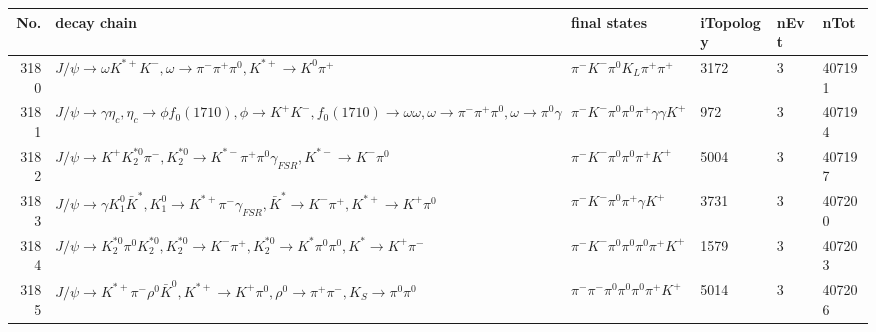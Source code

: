 \begin{table}[htbp] 
\begin{center}
\begin{small}
\begin{tabular}{rlllll}\hline\hline
 No. & decay chain & final states &  iTopology & nEvt & nTot \\\hline
3180&$J/\psi       \rightarrow \omega         K^{*+}         K^{-}          , \omega          \rightarrow \pi^{-}        \pi^{+}        \pi^{0}        , K^{*+}          \rightarrow K^{0}          \pi^{+}        $&$\pi^{-}        K^{-}          \pi^{0}        K_{L}          \pi^{+}        \pi^{+}        $& 3172&    3&407191\\
3181&$J/\psi       \rightarrow \gamma       \eta_{c}    , \eta_{c}     \rightarrow \phi           f_{0}(1710)    , \phi            \rightarrow K^{+}          K^{-}          , f_{0}(1710)     \rightarrow \omega         \omega         , \omega          \rightarrow \pi^{-}        \pi^{+}        \pi^{0}        , \omega          \rightarrow \pi^{0}        \gamma       $&$\pi^{-}        K^{-}          \pi^{0}        \pi^{0}        \pi^{+}        \gamma       \gamma       K^{+}          $&  972&    3&407194\\
3182&$J/\psi       \rightarrow K^{+}          K_2^{*0}       \pi^{-}        , K_2^{*0}        \rightarrow K^{*-}         \pi^{+}        \pi^{0}        \gamma_{FSR} , K^{*-}          \rightarrow K^{-}          \pi^{0}        $&$\pi^{-}        K^{-}          \pi^{0}        \pi^{0}        \pi^{+}        K^{+}          $& 5004&    3&407197\\
3183&$J/\psi       \rightarrow \gamma       K_1^{0}        \bar{K}^{*}   , K_1^{0}         \rightarrow K^{*+}         \pi^{-}        \gamma_{FSR} , \bar{K}^{*}    \rightarrow K^{-}          \pi^{+}        , K^{*+}          \rightarrow K^{+}          \pi^{0}        $&$\pi^{-}        K^{-}          \pi^{0}        \pi^{+}        \gamma       K^{+}          $& 3731&    3&407200\\
3184&$J/\psi       \rightarrow K_2^{*0}       \pi^{0}        K_2^{*0}       , K_2^{*0}        \rightarrow K^{-}          \pi^{+}        , K_2^{*0}        \rightarrow K^{*}          \pi^{0}        \pi^{0}        , K^{*}           \rightarrow K^{+}          \pi^{-}        $&$\pi^{-}        K^{-}          \pi^{0}        \pi^{0}        \pi^{0}        \pi^{+}        K^{+}          $& 1579&    3&407203\\
3185&$J/\psi       \rightarrow K^{*+}         \pi^{-}        \rho^{0}      \bar{K}^{0}   , K^{*+}          \rightarrow K^{+}          \pi^{0}        , \rho^{0}       \rightarrow \pi^{+}        \pi^{-}        , K_{S}           \rightarrow \pi^{0}        \pi^{0}        $&$\pi^{-}        \pi^{-}        \pi^{0}        \pi^{0}        \pi^{0}        \pi^{+}        K^{+}          $& 5014&    3&407206\\

\end{tabular}
\end{small}
\end{center}
\end{table}
